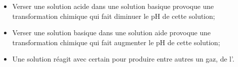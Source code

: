 \begin{mybilan}
	
	\begin{itemize}
		\item Verser une solution acide dans une solution basique provoque une transformation chimique qui fait diminuer le pH de cette solution;
		\item Verser une solution basique dans une solution aide provoque une transformation chimique qui fait augmenter le pH de cette solution;
		\item Une solution  réagit avec certain  pour produire entre autres un gaz, de l'.
	\end{itemize}
		 
\end{mybilan}
